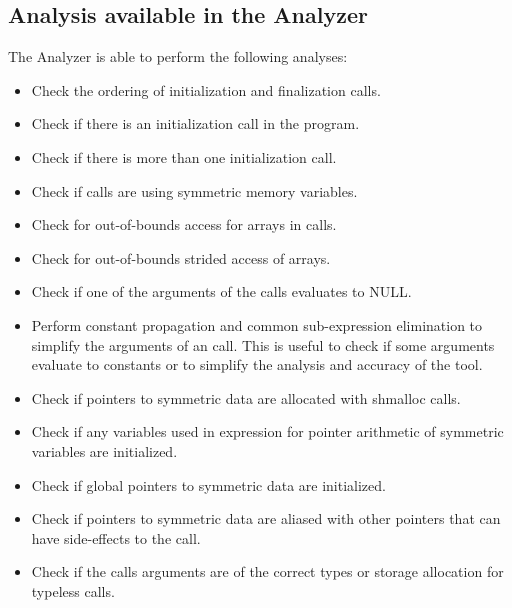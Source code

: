 \begin{minipage}{\linewidth}

  \subsection{Analysis available in the \openshmem Analyzer}

  The \openshmem Analyzer is able to perform the following analyses:

  \vspace{0.1in}

  \begin{itemize}
  \item Check the ordering of \openshmem initialization and
    finalization calls.
  \item Check if there is an \openshmem initialization call in the
    program.
  \item Check if there is more than one \openshmem initialization
    call.
  \item Check if \openshmem calls are using symmetric memory variables.
  \item Check for out-of-bounds access for arrays in \openshmem calls.
  \item Check for out-of-bounds strided access of arrays.
  \item Check if one of the arguments of the \openshmem calls
    evaluates to NULL.
  \item Perform constant propagation and common sub-expression
    elimination to simplify the arguments of an \openshmem call. This
    is useful to check if some arguments evaluate to constants or to
    simplify the analysis and accuracy of the tool.
  \item Check if pointers to symmetric data are allocated with
    shmalloc calls.
  \item Check if any variables used in expression for pointer
    arithmetic of symmetric variables are initialized.
  \item Check if global pointers to symmetric data are initialized.
  \item Check if pointers to symmetric data are aliased with other
    pointers that can have side-effects to the \openshmem call.
  \item Check if the \openshmem calls arguments are of the correct
    types or storage allocation for \openshmem typeless calls.

  \end{itemize}

\end{minipage}

